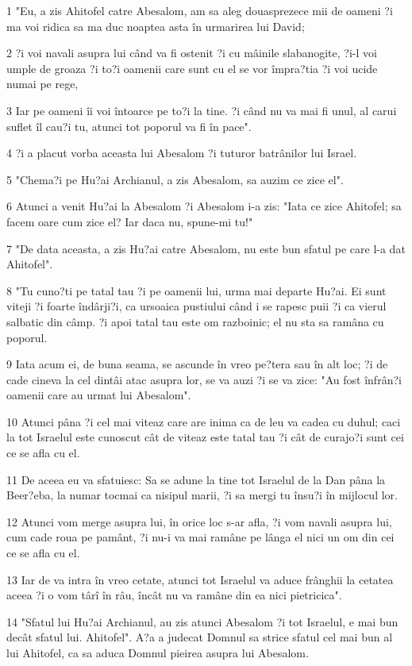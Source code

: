 \par 1 "Eu, a zis Ahitofel catre Abesalom, am sa aleg douasprezece mii de oameni ?i ma voi ridica sa ma duc noaptea asta în urmarirea lui David;
\par 2 ?i voi navali asupra lui când va fi ostenit ?i cu mâinile slabanogite, ?i-l voi umple de groaza ?i to?i oamenii care sunt cu el se vor împra?tia ?i voi ucide numai pe rege,
\par 3 Iar pe oameni îi voi întoarce pe to?i la tine. ?i când nu va mai fi unul, al carui suflet îl cau?i tu, atunci tot poporul va fi în pace".
\par 4 ?i a placut vorba aceasta lui Abesalom ?i tuturor batrânilor lui Israel.
\par 5 "Chema?i pe Hu?ai Archianul, a zis Abesalom, sa auzim ce zice el".
\par 6 Atunci a venit Hu?ai la Abesalom ?i Abesalom i-a zis: "Iata ce zice Ahitofel; sa facem oare cum zice el? Iar daca nu, spune-mi tu!"
\par 7 "De data aceasta, a zis Hu?ai catre Abesalom, nu este bun sfatul pe care l-a dat Ahitofel".
\par 8 "Tu cuno?ti pe tatal tau ?i pe oamenii lui, urma mai departe Hu?ai. Ei sunt viteji ?i foarte îndârji?i, ca ursoaica pustiului când i se rapesc puii ?i ca vierul salbatic din câmp. ?i apoi tatal tau este om razboinic; el nu sta sa ramâna cu poporul.
\par 9 Iata acum ei, de buna seama, se ascunde în vreo pe?tera sau în alt loc; ?i de cade cineva la cel dintâi atac asupra lor, se va auzi ?i se va zice: "Au fost înfrân?i oamenii care au urmat lui Abesalom".
\par 10 Atunci pâna ?i cel mai viteaz care are inima ca de leu va cadea cu duhul; caci la tot Israelul este cunoscut cât de viteaz este tatal tau ?i cât de curajo?i sunt cei ce se afla cu el.
\par 11 De aceea eu va sfatuiesc: Sa se adune la tine tot Israelul de la Dan pâna la Beer?eba, la numar tocmai ca nisipul marii, ?i sa mergi tu însu?i în mijlocul lor.
\par 12 Atunci vom merge asupra lui, în orice loc s-ar afla, ?i vom navali asupra lui, cum cade roua pe pamânt, ?i nu-i va mai ramâne pe lânga el nici un om din cei ce se afla cu el.
\par 13 Iar de va intra în vreo cetate, atunci tot Israelul va aduce frânghii la cetatea aceea ?i o vom târî în râu, încât nu va ramâne din ea nici pietricica".
\par 14 "Sfatul lui Hu?ai Archianul, au zis atunci Abesalom ?i tot Israelul, e mai bun decât sfatul lui. Ahitofel". A?a a judecat Domnul sa strice sfatul cel mai bun al lui Ahitofel, ca sa aduca Domnul pieirea asupra lui Abesalom.
